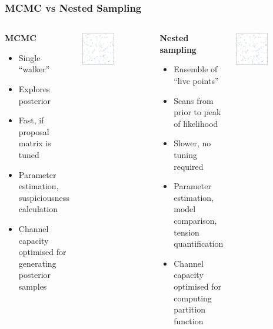 \documentclass[aspectratio=169]{beamer}
\begin{document}
\begin{frame}
    \frametitle{MCMC vs Nested Sampling}
    \begin{columns}
        \begin{block}{\textbf{MCMC}}
            \begin{itemize}
                \item Single ``walker''
                \item Explores posterior
                \item Fast, if proposal matrix is tuned
                \item Parameter estimation, suspiciousness calculation
                \item Channel capacity optimised for generating posterior samples
            \end{itemize}
        \end{block}
        \centerline{\includegraphics[width=0.5\textwidth,page=19]{figures/himmelblau}}
        \begin{block}{\textbf{Nested sampling}}
            \begin{itemize}
                \item Ensemble of ``live points''
                \item Scans from prior to peak of likelihood
                \item Slower, no tuning required
                \item Parameter estimation, model comparison, tension quantification
                \item Channel capacity optimised for computing partition function
            \end{itemize}
        \end{block}
        \centerline{\includegraphics[width=0.5\textwidth,page=4]{figures/himmelblau}} 

\end{columns}
\end{frame}
\end{document}
